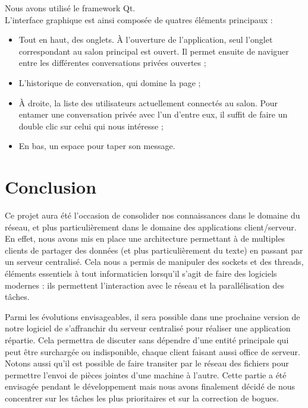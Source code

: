 			Nous avons utilisé le framework Qt.\\
			
			L'interface graphique est ainsi composée de quatres éléments principaux :
			\begin{itemize}
				\item Tout en haut, des onglets. À l'ouverture de l'application, seul l'onglet correspondant au salon principal est ouvert. Il permet ensuite de naviguer entre les différentes conversations privées ouvertes ;
				\item L'historique de conversation, qui domine la page ;
				\item À droite, la liste des utilisateurs actuellement connectés au salon. Pour entamer une conversation privée avec l'un d'entre eux, il suffit de faire un double clic sur celui qui nous intéresse ;
				\item En bas, un espace pour taper son message.
			\end{itemize}
			
			
			

\chapter*{Conclusion}
	Ce projet aura été l'occasion de consolider nos connaissances dans le domaine du réseau, et plus particulièrement dans le domaine des applications client/serveur. En effet, nous avons mis en place une architecture permettant à de multiples clients de partager des données (et plus particulièrement du texte) en passant par un serveur centralisé. Cela nous a permis de manipuler des sockets et des threads, éléments essentiels à tout informaticien lorsqu'il s'agit de faire des logiciels modernes : ils permettent l'interaction avec le réseau et la parallélisation des tâches.
	
	Parmi les évolutions envisageables, il sera possible dans une prochaine version de notre logiciel de s'affranchir du serveur centralisé pour réaliser une application répartie. Cela permettra de discuter sans dépendre d'une entité principale qui peut être surchargée ou indisponible, chaque client faisant aussi office de serveur. Notons aussi qu'il est possible de faire transiter par le réseau des fichiers pour permettre l'envoi de pièces jointes d'une machine à l'autre. Cette partie a été envisagée pendant le développement mais nous avons finalement décidé de nous concentrer sur les tâches les plus prioritaires et sur la correction de bogues.
